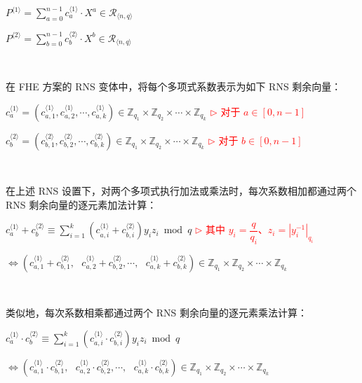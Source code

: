 $P^{\langle 1 \rangle} = \sum\limits_{a=0}^{n-1} c^{\langle 1 \rangle}_a \cdot X^a \in \mathcal{R}_{\langle n, q\rangle}$

$P^{\langle 2 \rangle} = \sum\limits_{b=0}^{n-1} c^{\langle 2 \rangle}_b \cdot X^b \in \mathcal{R}_{\langle n, q\rangle}$

$ $

在 FHE 方案的 RNS 变体中，将每个多项式系数表示为如下 RNS 剩余向量：

$c^{\langle 1 \rangle}_a = (c^{\langle 1 \rangle}_{a,1}, c^{\langle 1 \rangle}_{a,2}, \cdots, c^{\langle 1 \rangle}_{a,k}) \in \mathbb{Z}_{q_1} \times \mathbb{Z}_{q_2} \times \cdots \times \mathbb{Z}_{q_k}$ \textcolor{red}{ $\rhd$ 对于 $a \in [0, n - 1]$}

$c^{\langle 2 \rangle}_b = (c^{\langle 2 \rangle}_{b,1}, c^{\langle 2 \rangle}_{b,2}, \cdots, c^{\langle 2 \rangle}_{b,k}) \in \mathbb{Z}_{q_1} \times \mathbb{Z}_{q_2} \times \cdots \times \mathbb{Z}_{q_k}$ \textcolor{red}{ $\rhd$ 对于 $b \in [0, n - 1]$}

$ $

在上述 RNS 设置下，对两个多项式执行加法或乘法时，每次系数相加都通过两个 RNS 剩余向量的逐元素加法计算：

$c^{\langle 1 \rangle}_a + c^{\langle 2 \rangle}_b \equiv \sum\limits_{i=1}^k (c^{\langle 1 \rangle}_{a,i} + c^{\langle 2 \rangle}_{b,i}) y_i z_i \bmod q $ \textcolor{red}{ $\rhd$ 其中 $y_i = \dfrac{q}{q_i}$、$z_i = |y_i^{-1}|_{q_i}$}

$\Longleftrightarrow (c^{\langle 1 \rangle}_{a,1} + c^{\langle 2 \rangle}_{b,1}, \text{ } c^{\langle 1 \rangle}_{a,2} + c^{\langle 2 \rangle}_{b,2}, \cdots, \text{ } c^{\langle 1 \rangle}_{a,k} + c^{\langle 2 \rangle}_{b,k}) \in \mathbb{Z}_{q_1} \times \mathbb{Z}_{q_2} \times \cdots \times \mathbb{Z}_{q_k}$

$ $

类似地，每次系数相乘都通过两个 RNS 剩余向量的逐元素乘法计算：

$c^{\langle 1 \rangle}_a \cdot c^{\langle 2 \rangle}_b \equiv \sum\limits_{i=1}^k (c^{\langle 1 \rangle}_{a,i} \cdot c^{\langle 2 \rangle}_{b,i}) y_i z_i \bmod q $

$\Longleftrightarrow (c^{\langle 1 \rangle}_{a,1} \cdot c^{\langle 2 \rangle}_{b,1}, \text{ } c^{\langle 1 \rangle}_{a,2} \cdot c^{\langle 2 \rangle}_{b,2}, \cdots, \text{ } c^{\langle 1 \rangle}_{a,k} \cdot c^{\langle 2 \rangle}_{b,k}) \in \mathbb{Z}_{q_1} \times \mathbb{Z}_{q_2} \times \cdots \times \mathbb{Z}_{q_k}$

